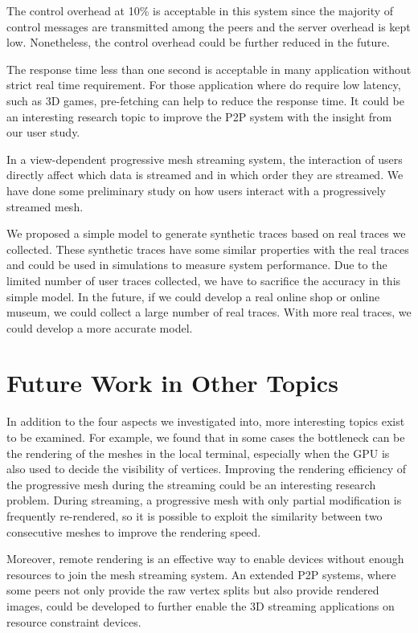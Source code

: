 The control overhead at 10\% is acceptable in this system since the majority of
control messages are transmitted among the peers and the server overhead is kept low. 
Nonetheless, the control overhead could be further reduced in the future. 

The response time less than one second is acceptable in many application without 
strict real time requirement. For those application where do require low latency, such
as 3D games, pre-fetching can help to reduce the response time. It could be an interesting 
research topic to improve the P2P system with the insight from our user study.

In a view-dependent progressive mesh streaming system, the interaction of users directly
affect which data is streamed and in which order they are streamed.
We have done some preliminary study on how users interact 
with a progressively streamed mesh.

We proposed a simple model 
to generate synthetic traces based on real traces we collected. 
These synthetic traces have some similar properties with the real traces and 
could be used in simulations to measure system performance.
Due to the limited number of user traces collected, we have to 
sacrifice the accuracy in this simple model. In the future, if we could develop a real 
online shop or online museum, we could collect a large number of real traces.
With more real traces, we could develop a more accurate model.

\section{Future Work in Other Topics}
In addition to the four aspects we investigated into, more interesting topics exist to be examined.
For example, we found that in some cases the bottleneck can be the rendering of the meshes in the local 
terminal, especially when the GPU is also used to decide the visibility of vertices. 
Improving the rendering efficiency of the progressive mesh during the streaming 
could be an interesting research problem.  
During streaming, a progressive mesh with only partial modification is frequently re-rendered, 
so it is possible to exploit the similarity between two consecutive meshes to improve the rendering speed.

Moreover, remote rendering is an effective way to enable devices without enough resources to 
join the mesh streaming system. An extended P2P systems, where some peers not only provide the raw vertex splits
but also provide rendered images, could be developed to further enable the 3D streaming applications on resource
constraint devices.
